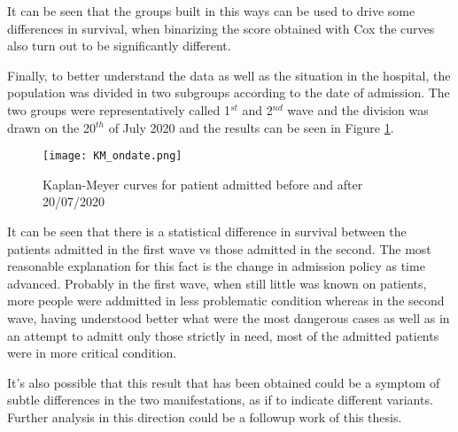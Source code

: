 It can be seen that the groups built in this ways can be used to drive some differences in survival, when binarizing the score obtained with Cox the curves also turn out to be significantly different.

Finally, to better understand the data as well as the situation in the hospital,  the population was divided in two subgroups according to the date of admission. 
The two groups were representatively called 1$^{st}$ and 2$^{nd}$ wave and the division was drawn on the 20$^{th}$ of July 2020 and the results can be seen in Figure \ref{fig:kmwaves}.

\begin{figure}
\texttt{[image: KM\_ondate.png]}
\caption{Kaplan-Meyer curves for patient admitted before and after 20/07/2020 \label{fig:kmwaves}}
\end{figure}

It can be seen that there is a statistical difference in survival between the patients admitted in the first wave vs those admitted in the second. 
The most reasonable explanation for this fact is the change in admission policy as time advanced.
Probably in the first wave, when still little was known on \covid patients, more people were addmitted in less problematic condition whereas in the second wave, having understood better what were the most dangerous cases as well as in an attempt to admitt only those  strictly in need, most of the admitted patients were in more critical condition.

It's also possible that this result that has been obtained could be a symptom of subtle differences in the two \covid manifestations, as if to indicate different variants.
Further analysis in this direction could be a followup work of this thesis.